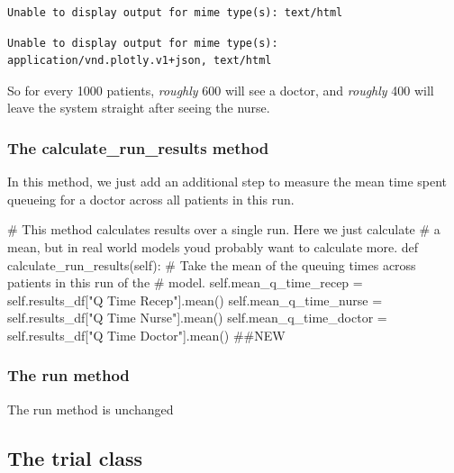 \documentclass[
  letterpaper,
  DIV=11,
  numbers=noendperiod]{scrreprt}
\newenvironment{Shaded}{}{}
\newcommand{\CommentTok}[1]{\textcolor[rgb]{0.42,0.45,0.49}{#1}}
\newcommand{\KeywordTok}[1]{\textcolor[rgb]{0.84,0.23,0.29}{#1}}
\newcommand{\NormalTok}[1]{\textcolor[rgb]{0.14,0.16,0.18}{#1}}
\newcommand{\OperatorTok}[1]{\textcolor[rgb]{0.14,0.16,0.18}{#1}}
\newcommand{\StringTok}[1]{\textcolor[rgb]{0.01,0.18,0.38}{#1}}
\newcommand{\VariableTok}[1]{\textcolor[rgb]{0.89,0.38,0.04}{#1}}
\begin{document}
\begin{verbatim}
Unable to display output for mime type(s): text/html
\end{verbatim}

\begin{verbatim}
Unable to display output for mime type(s): application/vnd.plotly.v1+json, text/html
\end{verbatim}

So for every 1000 patients, \emph{roughly} 600 will see a doctor, and
\emph{roughly} 400 will leave the system straight after seeing the
nurse.

\subsubsection{The calculate\_run\_results
method}\label{the-calculate_run_results-method}

In this method, we just add an additional step to measure the mean time
spent queueing for a doctor across all patients in this run.

\begin{Shaded}
\begin{Highlighting}[]
\CommentTok{\# This method calculates results over a single run.  Here we just calculate}
\CommentTok{\# a mean, but in real world models you\textquotesingle{}d probably want to calculate more.}
\KeywordTok{def}\NormalTok{ calculate\_run\_results(}\VariableTok{self}\NormalTok{):}
    \CommentTok{\# Take the mean of the queuing times across patients in this run of the}
    \CommentTok{\# model.}
    \VariableTok{self}\NormalTok{.mean\_q\_time\_recep }\OperatorTok{=} \VariableTok{self}\NormalTok{.results\_df[}\StringTok{"Q Time Recep"}\NormalTok{].mean()}
    \VariableTok{self}\NormalTok{.mean\_q\_time\_nurse }\OperatorTok{=} \VariableTok{self}\NormalTok{.results\_df[}\StringTok{"Q Time Nurse"}\NormalTok{].mean()}
    \VariableTok{self}\NormalTok{.mean\_q\_time\_doctor }\OperatorTok{=} \VariableTok{self}\NormalTok{.results\_df[}\StringTok{"Q Time Doctor"}\NormalTok{].mean() }\CommentTok{\#\#NEW}
\end{Highlighting}
\end{Shaded}

\subsubsection{The run method}\label{the-run-method}

The run method is unchanged

\subsection{The trial class}\label{the-trial-class-1}
\end{document}
